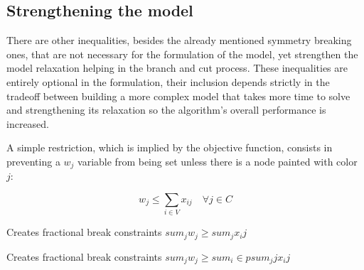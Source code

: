 \subsection{Strengthening the model}

There are other inequalities, besides the already mentioned symmetry breaking ones, that are not necessary for the formulation of the model, yet strengthen the model relaxation helping in the branch and cut process. These inequalities are entirely optional in the formulation, their inclusion depends strictly in the tradeoff between building a more complex model that takes more time to solve and strengthening its relaxation so the algorithm's overall performance is increased.

A simple restriction, which is implied by the objective function, consists in preventing a $w_j$ variable from being set unless there is a node painted with color $j$:

\begin{equation}
\label{eqn:wjleqsumcolor}
w_j \leq \sum_{i \in V} x_{ij} \quad \forall j \in C
\end{equation}

Creates fractional break constraints $sum_j w_j \geq sum_j x_ij$ 

Creates fractional break constraints $sum_j w_j \geq sum_i \in p sum_j j x_ij$